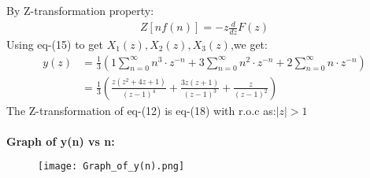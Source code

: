 \documentclass[journal,12pt,twocolumn]{IEEEtran}
\theoremstyle{remark}
\begin{document}
By Z-transformation property:
\begin{align}
Z[nf(n)]=-z\frac{d}{dz}F(z)
\end{align}
Using eq-(15) to get $X_1(z),X_2(z),X_3(z)$,we get:
\begin{align}
    y(z)&=\frac{1}{3} \left( 1 \sum_{n=0}^{\infty} n^3 \cdot z^{-n} + 3 \sum_{n=0}^{\infty} n^2 \cdot z^{-n} + 2 \sum_{n=0}^{\infty} n \cdot z^{-n} \right)\\
    &=\frac{1}{3} \left( \frac{z(z^2+4z+1)}{(z-1)^4} + \frac{3z(z+1)}{(z-1)^3} + \frac{z}{(z-1)^2} \right)
\end{align}
The Z-transformation of eq-(12) is eq-(18) with r.o.c as:$|z|>1$\\ \\
\textbf{Graph of y(n) vs n:}
\begin{figure}[h]
        \centering
\texttt{[image: Graph\_of\_y(n).png]}
    \end{figure}
\end{document}
